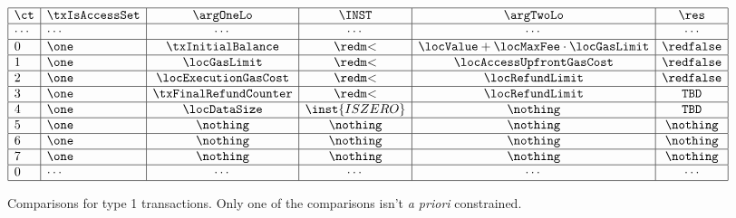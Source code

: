 \begin{figure}[!h]
	\[                                                                                                                          
	\begin{array}{|l|l|c|c|c|c|c|c|} \hline                                                                                                                      
		\ct    & \txIsAccessSet & \argOneLo             & \INST         & \argTwoLo                                 & \res         \\ \hline
		\cdots & \cdots         & \cdots                & \cdots        & \cdots                                    & \cdots       \\ \hline
		0      & \one           & \txInitialBalance     & \locLT        & \locValue + \locMaxFee \cdot \locGasLimit & \rFaux       \\ \hline
		1      & \one           & \locGasLimit          & \locLT        & \locAccessUpfrontGasCost                  & \rFaux       \\ \hline
		2      & \one           & \locExecutionGasCost  & \locLT        & \locRefundLimit                           & \rFaux       \\ \hline
		3      & \one           & \txFinalRefundCounter & \locLT        & \locRefundLimit                           & \texttt{TBD} \\ \hline
		4      & \one           & \locDataSize          & \inst{ISZERO} & \nothing                                  & \texttt{TBD} \\ \hline
		5      & \one           & \nothing              & \nothing      & \nothing                                  & \nothing     \\ \hline
		6      & \one           & \nothing              & \nothing      & \nothing                                  & \nothing     \\ \hline
		7      & \one           & \nothing              & \nothing      & \nothing                                  & \nothing     \\ \hline
		0      & \cdots         & \cdots                & \cdots        & \cdots                                    & \cdots       \\ \hline
	\end{array}                                                                                                                 
	\]                                                                                                                          
	\caption{%
		Comparisons for type 1 transactions. \saNote{} Only one of the comparisons isn't \emph{a priori} constrained.}
\end{figure}                                                                                                                

